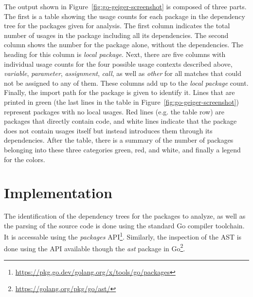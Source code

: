 

The output shown in Figure~\ref{fig:go-geiger-screenshot} is composed of three parts.
The first is a table showing the \unsafe{} usage counts for each package in the dependency tree for the packages
given for analysis.
The first column indicates the total number of usages in the package including all its dependencies.
The second column shows the number for the package alone, without the dependencies.
The heading for this column is \textit{local package}.
Next, there are five columns with individual usage counts for the four possible usage contexts described above,
\textit{variable}, \textit{parameter}, \textit{assignment}, \textit{call}, as well as \textit{other} for all matches
that could not be assigned to any of them.
These columns add up to the \textit{local package} count.
Finally, the import path for the package is given to identify it.
Lines that are printed in green (the last  lines in the table in Figure~\ref{fig:go-geiger-screenshot})
represent packages with no local \unsafe{} usages.
Red lines (e.g. the  table row) are packages that directly contain \unsafe{} code, and white lines indicate
that the package does not contain \unsafe{} usages itself but instead introduces them through its dependencies.
After the table, there is a summary of the number of packages belonging into these three categories green, red, and
white, and finally a legend for the colors.



\section{Implementation}\label{sec:go-geiger:implementation}

The identification of the dependency trees for the packages to analyze, as well as the parsing of the source code is
done using the standard Go compiler toolchain.
It is accessable using the \textit{packages}
\acrshort{API}\footnote{\url{https://pkg.go.dev/golang.org/x/tools/go/packages}}.
Similarly, the inspection of the \acrshort{AST} is done using the \acrshort{API} available though the \textit{ast}
package in Go\footnote{\url{https://golang.org/pkg/go/ast/}}.


